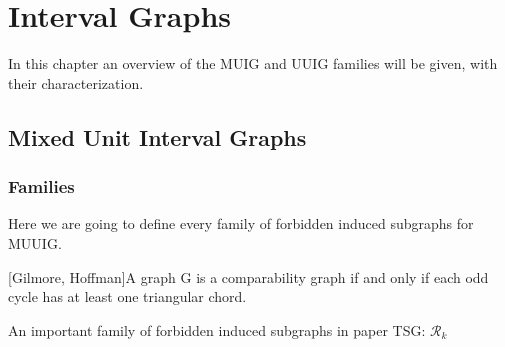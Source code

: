 \chapter{Interval Graphs}

In this chapter an overview of the MUIG and UUIG families will be given, with their characterization.


\section{Mixed Unit Interval Graphs}


\subsection{Families}

Here we are going to define every family of forbidden induced subgraphs for MUUIG.

\theorem\label{compaTriangular}[Gilmore, Hoffman]{A graph G is a comparability graph if and only if each odd cycle has at least one triangular chord. \cite{gilmoreCharacterizationComparabilityGraphs1964}}

An important family of forbidden induced subgraphs in paper TSG: $\mathcal{R}_k$

